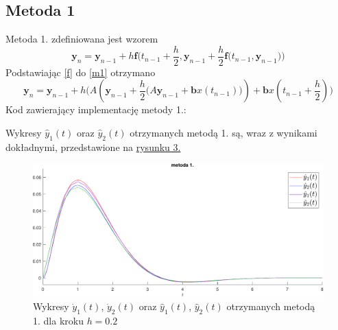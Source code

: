 \documentclass[a4paper, 12pt, twoside, openany]{article}
\newcommand{\y}{\mathbf{y}}
\renewcommand{\b}{\mathbf{b}}
\begin{document}
    \subsection{Metoda 1}
    Metoda 1. zdefiniowana jest wzorem
    \begin{equation}
        \label{m1}
        \y_n = \y_{n-1} +
        h\mathbf{f}\bigg(t_{n-1} + \dfrac{h}{2},\y_{n-1} +              \dfrac{h}{2}\mathbf{f}\big(t_{n-1},\y_{n-1}\big)\bigg)
    \end{equation}
    Podstawiając \eqref{f} do \eqref{m1} otrzymano
    $$
    \y_n = \y_{n-1} +
    h\Bigg(A\left(\y_{n-1} + \dfrac{h}{2}\Big(A\y_{n-1} + \b x(t_{n-1})\Big)\right) +
    \b x\left(t_{n-1} + \dfrac{h}{2}\right)\Bigg)
    $$
    Kod zawierający implementację metody 1.:
    
    \noindent
    Wykresy $\hat{y}_1(t)$ oraz $\hat{y}_2(t)$ otrzymanych metodą 1. są, wraz z wynikami dokładnymi, przedstawione na \hyperref[fig:rys3]{rysunku 3.}
    \begin{figure}[H]
        \centering
        \includegraphics[width=\linewidth]{wykres2t.pdf}
        \caption{Wykresy $\dot{y}_1(t)$, $\dot{y}_2(t)$ oraz $\hat{y}_1(t)$, $\hat{y}_2(t)$ otrzymanych metodą 1. dla kroku $h = 0.2$ }
        \label{fig:rys3} %
    \end{figure}

    \newpage
\end{document}
